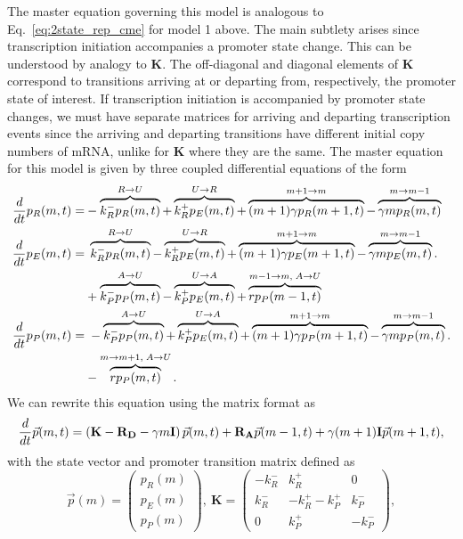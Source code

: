 The master equation governing this model is analogous to
Eq.~\ref{eq:2state_rep_cme} for model 1 above. The main subtlety arises since
transcription initiation accompanies a promoter state change. This can be
understood by analogy to $\mathbf{K}$. The off-diagonal and diagonal elements of
$\mathbf{K}$ correspond to transitions arriving at or departing from,
respectively, the promoter state of interest. If transcription initiation is
accompanied by promoter state changes, we must have separate matrices for
arriving and departing transcription events since the arriving and departing
transitions have different initial copy numbers of mRNA, unlike for $\mathbf{K}$
where they are the same. The master equation for this model is given by three
coupled differential equations of the form
\begin{align}
\begin{split}
\frac{d {}}{d t}p_R(m,t) =& 
- \overbrace{k_R^- p_R(m,t)}^{R \rightarrow U}
+ \overbrace{k_R^+ p_E(m,t)}^{U \rightarrow R}
+ \overbrace{(m+1)\gamma p_R(m+1,t)}^{m + 1 \rightarrow m}
- \overbrace{\gamma mp_R(m,t)}^{m \rightarrow m - 1}
\\
\frac{d {}}{d t}p_E(m,t) =&\; 
    \overbrace{k_R^- p_R(m,t)}^{R \rightarrow U}
- \overbrace{k_R^+ p_E(m,t)}^{U \rightarrow R}
+ \overbrace{(m+1)\gamma p_E(m+1,t)}^{m + 1 \rightarrow m}
- \overbrace{\gamma mp_E(m,t)}^{m \rightarrow m - 1}.
\\
&
+ \overbrace{k_P^- p_P(m,t)}^{A \rightarrow U}
- \overbrace{k_P^+ p_E(m,t)}^{U \rightarrow A}
+ \overbrace{rp_P(m-1,t)}^{m-1 \rightarrow m,\;A \rightarrow U}
\\
\frac{d {}}{d t}p_P(m,t) =&\; 
- \overbrace{k_P^- p_P(m,t)}^{A \rightarrow U}
+ \overbrace{k_P^+ p_E(m,t)}^{U \rightarrow A}
+ \overbrace{(m+1)\gamma p_P(m+1,t)}^{m + 1 \rightarrow m}
- \overbrace{\gamma mp_P(m,t)}^{m \rightarrow m - 1}.
\\
&- \overbrace{rp_P(m,t)}^{m \rightarrow m + 1,\;A \rightarrow U}.
\end{split}
\end{align}
We can rewrite this equation using the matrix format as
\begin{equation}
\frac{d {}}{d t}\vec{p}(m,t) =
\left( \mathbf{K} - \mathbf{R_D} - \gamma m \mathbf{I} \right) \vec{p}(m,t)
                + \mathbf{R_A} \vec{p}(m-1,t) +
                \gamma (m+1) \mathbf{I} \vec{p}(m+1,t),
\label{eq:3state_rep_cme}
\end{equation}
with the state vector and promoter transition matrix defined as
\begin{equation}
\vec{p}(m) = \begin{pmatrix} p_R(m) \\ p_E(m) \\ p_P(m) \end{pmatrix},\
\mathbf{K} = \begin{pmatrix} -k_R^- & k_R^+ & 0 \\
                        k_R^- & -k_R^+ -k_P^+ & k_P^- \\
                        0 & k_P^+ & -k_P^- 
                \end{pmatrix},
\label{eq:3state_cme_matrices_pt1}
\end{equation}
